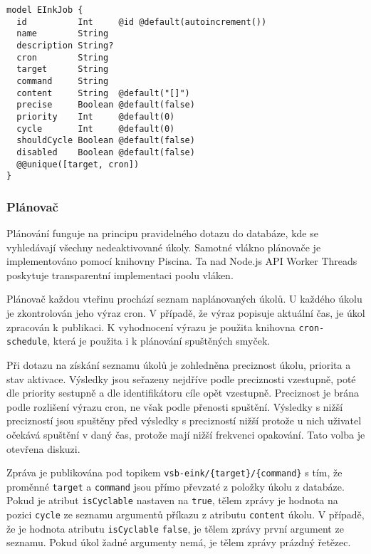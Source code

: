 \begin{lstlisting}[label=src:scheduler-schema,caption={Datové schéma třídy EInkJob}]
model EInkJob {
  id          Int     @id @default(autoincrement())
  name        String
  description String?
  cron        String
  target      String
  command     String
  content     String  @default("[]")
  precise     Boolean @default(false)
  priority    Int     @default(0)
  cycle       Int     @default(0)
  shouldCycle Boolean @default(false)
  disabled    Boolean @default(false)
  @@unique([target, cron])
}
\end{lstlisting}

\subsubsection{Plánovač}
Plánování funguje na principu pravidelného dotazu do databáze, kde se vyhledávají všechny nedeaktivované úkoly. Samotné vlákno plánovače je implementováno pomocí knihovny Piscina. Ta nad Node.js API Worker Threads poskytuje transparentní implementaci poolu vláken.

Plánovač každou vteřinu prochází seznam naplánovaných úkolů. U každého úkolu je zkontrolován jeho výraz cron. V případě, že výraz popisuje aktuální čas, je úkol zpracován k publikaci. K vyhodnocení výrazu je použita knihovna \lstinline{cron-schedule}, která je použita i k plánování spuštěných smyček. 

Při dotazu na získání seznamu úkolů je zohledněna preciznost úkolu, priorita a stav aktivace. Výsledky jsou seřazeny nejdříve podle preciznosti vzestupně, poté dle priority sestupně a dle identifikátoru cíle opět vzestupně. Preciznost je brána podle rozlišení výrazu cron, ne však podle přenosti spuštění. Výsledky s nižší precizností jsou spuštěny před výsledky s precizností nižší protože u nich uživatel očekává spuštění v daný čas, protože mají nižší frekvenci opakování. Tato volba je otevřena diskuzi.

Zpráva je publikována pod topikem \lstinline|vsb-eink/{target}/{command}| s tím, že proměnné \lstinline{target} a \lstinline{command} jsou přímo převzaté z položky úkolu z databáze. Pokud je atribut \lstinline{isCyclable} nastaven na \lstinline{true}, tělem zprávy je hodnota na pozici \lstinline{cycle} ze seznamu argumentů příkazu z atributu \lstinline{content} úkolu. V případě, že je hodnota atributu \lstinline{isCyclable} \lstinline{false}, je tělem zprávy první argument ze seznamu. Pokud úkol žadné argumenty nemá, je tělem zprávy prázdný řetězec.

